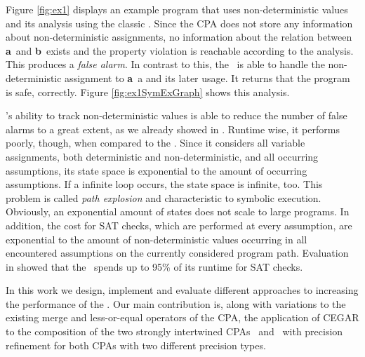 Figure \ref{fig:ex1} displays an example program that uses non-deterministic values and its analysis using the classic .
Since the CPA does not store any information about non-deterministic assignments, no information about the relation between \textbf{a}\ and \textbf{b}\ exists and the property violation is reachable according to the analysis. This produces a \emph{false alarm}.
In contrast to this, the \symbolicExecutionCPA\ is able to handle the non-deterministic assignment to \textbf{a}\ a and its later usage. It returns that the program is safe, correctly.
Figure \ref{fig:ex1SymExGraph} shows this analysis. 

\SymbolicExecutionCPA's ability to track non-deterministic values is able to reduce the number of false alarms to a great extent, as we already showed in \cite{Lemberger2015}.
Runtime wise, it performs poorly, though, when compared to the .
Since it considers all variable assignments, both deterministic and non-deterministic, and all occurring assumptions, its state space is exponential to the amount of occurring assumptions.
If a infinite loop occurs, the state space is infinite, too.
This problem is called \emph{path explosion} and characteristic to symbolic execution.\cite{Anand2008}
Obviously, an exponential amount of states does not scale to large programs.
In addition, the cost for SAT checks, which are performed at every assumption, are exponential to the amount of non-deterministic values occurring in all encountered assumptions on the currently considered program path.
Evaluation in \cite{Lemberger2015} showed that the \symbolicExecutionCPA\ spends up to 95\% of its runtime for SAT checks.

In this work we design, implement and evaluate different approaches to increasing the performance of the \symbolicExecutionCPA.
Our main contribution is, along with variations to the existing merge and less-or-equal operators of the CPA,
the application of CEGAR \cite{Clarke2003} to the composition of the two strongly intertwined CPAs \symbolicValueAnalysisCPA\ and \constraintsCPA\ with precision refinement for both CPAs
with two different precision types.


